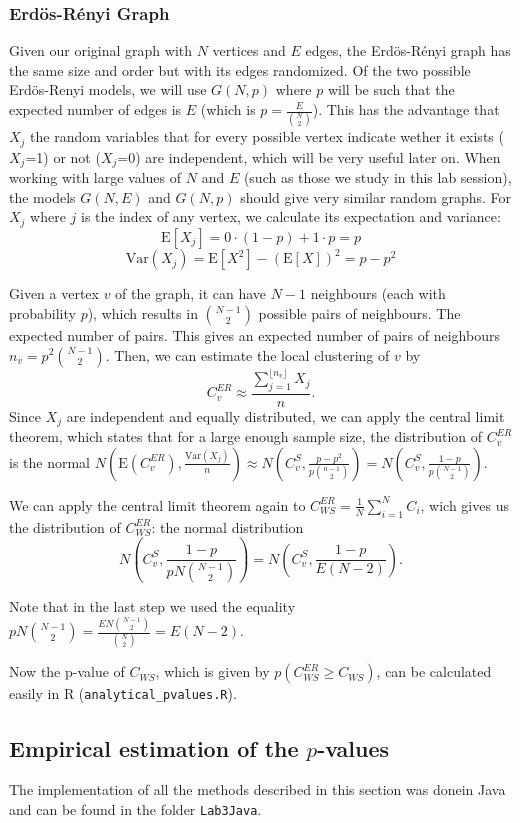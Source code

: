 \documentclass[paper=a4, fontsize=11pt]{scrartcl} %
\newcommand{\E}{\mathrm{E}}
\newcommand{\Var}{\mathrm{Var}}
\begin{document}
\subsubsection{Erdös-Rényi Graph}
Given our original graph with $N$ vertices and $E$ edges, the Erdös-Rényi graph has the same size and order but with its edges randomized.  Of the two possible Erdös-Renyi models, we will use $G(N,p)$ where $p$ will be such that the expected number of edges is $E$ (which is $p=\frac{E}{\binom{N}{2}}$). This has the advantage that $X_j$ the random variables that for every possible vertex indicate wether it exists ($X_j$=1) or not ($X_j$=0) are independent, which will be very useful later on. When working with large values of $N$ and $E$ (such as those we study in this lab session), the models $G(N,E)$ and $G(N,p)$ should give very similar random graphs. 
For $X_j$ where $j$ is the index of any vertex, we calculate its expectation and variance: 
$$\E[X_j]=0\cdot(1-p)+1\cdot p=p$$
$$\Var(X_j)=\E[X^2]-(\E[X])^2=p-p^2$$

Given a vertex $v$ of the graph, it can have $N-1$ neighbours (each with probability $p$), which results in $\binom{N-1}{2}$ possible pairs of neighbours. The expected number of pairs. This gives an expected number of pairs of neighbours $n_v=p^2\binom{N-1}{2}$.  Then, we can estimate the local clustering of $v$ by $$C_v^{ER}\approx \frac{\sum_{j=1}^{\lfloor n_v\rfloor}X_j}{n}.$$
Since $X_j$ are independent and equally distributed, we can apply the central limit theorem, which states that for a large enough sample size, the distribution of $C_v^{ER}$ is the normal $N(\E(C_v^{ER}),\frac{\Var(X_j)}{n})\approx N(C_v^S,\frac{p-p^2}{p\binom{n-1}{2}})=N(C_v^S,\frac{1-p}{p\binom{N-1}{2}})$. 

We can apply the central limit theorem again to $C_{WS}^{ER}=\frac{1}{N}\sum_{i=1}^NC_i$, wich gives us the distribution of $C_{WS}^{ER}$: the normal distribution $$N(C_v^S,\frac{1-p}{pN\binom{N-1}{2}})=N(C_v^S,\frac{1-p}{E(N-2)}).$$


Note that in the last step we used the equality $pN\binom{N-1}{2}=\frac{EN\binom{N-1}{2}}{\binom{N}{2}}=E(N-2)$.

Now the p-value of $C_{WS}$, which is given by $p(C_{WS}^{ER}\geq C_{WS})$, can be calculated easily in R (\texttt{analytical\_pvalues.R}).

\subsection{Empirical estimation of the $p$-values}
The implementation of all the methods described in this section was donein Java and can be found in the folder \texttt{Lab3Java}.
\end{document}
